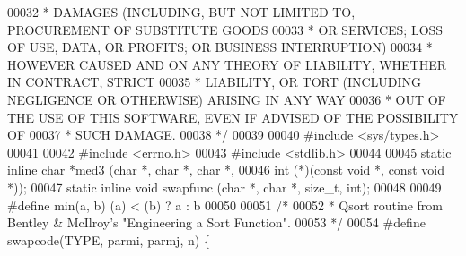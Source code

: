 \begin{DoxyCode}
00032 \textcolor{comment}{ * DAMAGES (INCLUDING, BUT NOT LIMITED TO, PROCUREMENT OF SUBSTITUTE GOODS}
00033 \textcolor{comment}{ * OR SERVICES; LOSS OF USE, DATA, OR PROFITS; OR BUSINESS INTERRUPTION)}
00034 \textcolor{comment}{ * HOWEVER CAUSED AND ON ANY THEORY OF LIABILITY, WHETHER IN CONTRACT, STRICT}
00035 \textcolor{comment}{ * LIABILITY, OR TORT (INCLUDING NEGLIGENCE OR OTHERWISE) ARISING IN ANY WAY}
00036 \textcolor{comment}{ * OUT OF THE USE OF THIS SOFTWARE, EVEN IF ADVISED OF THE POSSIBILITY OF}
00037 \textcolor{comment}{ * SUCH DAMAGE.}
00038 \textcolor{comment}{ */}
00039 
00040 \textcolor{preprocessor}{#}\textcolor{preprocessor}{include} \textcolor{preprocessor}{<}\textcolor{preprocessor}{sys}\textcolor{preprocessor}{/}\textcolor{preprocessor}{types}\textcolor{preprocessor}{.}\textcolor{preprocessor}{h}\textcolor{preprocessor}{>}
00041 
00042 \textcolor{preprocessor}{#}\textcolor{preprocessor}{include} \textcolor{preprocessor}{<}\textcolor{preprocessor}{errno}\textcolor{preprocessor}{.}\textcolor{preprocessor}{h}\textcolor{preprocessor}{>}
00043 \textcolor{preprocessor}{#}\textcolor{preprocessor}{include} \textcolor{preprocessor}{<}\textcolor{preprocessor}{stdlib}\textcolor{preprocessor}{.}\textcolor{preprocessor}{h}\textcolor{preprocessor}{>}
00044 
00045 \textcolor{keyword}{static} \textcolor{keyword}{inline} \textcolor{keywordtype}{char}  *med3 (\textcolor{keywordtype}{char} *, \textcolor{keywordtype}{char} *, \textcolor{keywordtype}{char} *,
00046     \textcolor{keywordtype}{int} (*)(\textcolor{keyword}{const} \textcolor{keywordtype}{void} *, \textcolor{keyword}{const} \textcolor{keywordtype}{void} *));
00047 \textcolor{keyword}{static} \textcolor{keyword}{inline} \textcolor{keywordtype}{void}   swapfunc (\textcolor{keywordtype}{char} *, \textcolor{keywordtype}{char} *, size\_t, \textcolor{keywordtype}{int});
00048 
00049 \textcolor{preprocessor}{#}\textcolor{preprocessor}{define} \textcolor{preprocessor}{min}\textcolor{preprocessor}{(}\textcolor{preprocessor}{a}\textcolor{preprocessor}{,} \textcolor{preprocessor}{b}\textcolor{preprocessor}{)}   \textcolor{preprocessor}{(}\textcolor{preprocessor}{a}\textcolor{preprocessor}{)} \textcolor{preprocessor}{<} \textcolor{preprocessor}{(}\textcolor{preprocessor}{b}\textcolor{preprocessor}{)} \textcolor{preprocessor}{?} \textcolor{preprocessor}{a} \textcolor{preprocessor}{:} \textcolor{preprocessor}{b}
00050 
00051 \textcolor{comment}{/*}
00052 \textcolor{comment}{ * Qsort routine from Bentley & McIlroy's "Engineering a Sort Function".}
00053 \textcolor{comment}{ */}
00054 \textcolor{preprocessor}{#}\textcolor{preprocessor}{define} \textcolor{preprocessor}{swapcode}\textcolor{preprocessor}{(}\textcolor{preprocessor}{TYPE}\textcolor{preprocessor}{,} \textcolor{preprocessor}{parmi}\textcolor{preprocessor}{,} \textcolor{preprocessor}{parmj}\textcolor{preprocessor}{,} \textcolor{preprocessor}{n}\textcolor{preprocessor}{)} \textcolor{preprocessor}{\{}

\end{DoxyCode}
